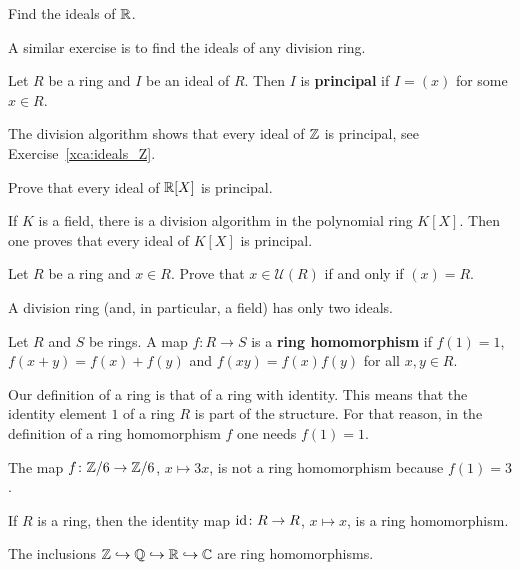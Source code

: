 \begin{exercise}
Find the ideals of $\mathbb{R}$.	
\end{exercise}

A similar exercise is to find the ideals of any division ring.  

\begin{definition}
Let $R$ be a ring and $I$ be an ideal of $R$. Then $I$ is \textbf{principal}
if $I=(x)$ for some $x\in R$. 	
\end{definition}

The division algorithm shows that every ideal of $\mathbb{Z}$ is principal, 
see Exercise~\ref{xca:ideals_Z}.  

\begin{exercise}
	Prove that every ideal of $\mathbb{R}[X]$ is principal. 
\end{exercise}

If $K$ is a field, there is a division algorithm in the 
polynomial ring $K[X]$. Then one proves 
that every ideal of $K[X]$ is principal.  

\begin{exercise}
\label{xca:x_unit}
	Let $R$ be a ring and $x\in R$. Prove that $x\in\mathcal{U}(R)$ if and only if
	$(x)=R$. 	
\end{exercise}

A division ring (and, in particular, a field) has only two ideals. 

\begin{definition}
Let $R$ and $S$ be rings. A map $f\colon R\to S$ is a \textbf{ring homomorphism}  
if $f(1)=1$, $f(x+y)=f(x)+f(y)$ and $f(xy)=f(x)f(y)$ for all $x,y\in R$. 	
\end{definition}

Our definition of a ring is that of a ring with identity. This means
that the identity element $1$ of a ring $R$ 
is part of the structure. For that reason, in 
the definition
of a ring homomorphism $f$ one needs $f(1)=1$.  

\begin{example}
The map $f\colon\mathbb{Z}/6\to\mathbb{Z}/6$, $x\mapsto 3x$, is not a ring homomorphism because
$f(1)=3$. 	
\end{example}
 
If $R$ is a ring, then  
the identity map $\operatorname{id}\colon R\to R$, $x\mapsto x$, is a ring homomorphism. 	

\begin{example}
The inclusions $\mathbb{Z}\hookrightarrow\mathbb{Q}\hookrightarrow\mathbb{R}\hookrightarrow\mathbb{C}$ 
are ring homomorphisms. 	
\end{example}

